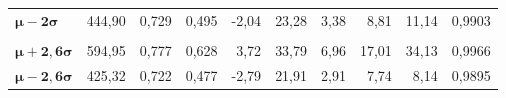 \begin{table}[htb]
\begin{tabulary}{0.97\textwidth}{lRRRRRRrrR}
	$ \bm{\mu-2\sigma} $    & 444,90                   & 0,729                                                              & 0,495                                    & -2,04                                                  & 23,28                       & 3,38                              & 8,81              & 11,14             & 0,9903                                                           \\
	\textbf{}             &                          &                                                                    &                                          &                                                        &                             &                                   &                   &                   &  \\
	$ \bm{\mu+2,6\sigma} $  & 594,95                   & 0,777                                                              & 0,628                                    & 3,72                                                   & 33,79                       & 6,96                              & 17,01             & 34,13             & 0,9966                                                           \\
	$ \bm{\mu-2,6\sigma} $  & 425,32                   & 0,722                                                              & 0,477                                    & -2,79                                                  & 21,91                       & 2,91                              & 7,74              & 8,14              & 0,9895                                                           \\ \bottomrule
\end{tabulary}
\end{table}






